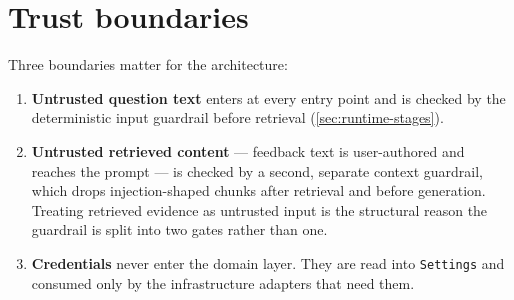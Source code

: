 \section{Trust boundaries}

Three boundaries matter for the architecture:

\begin{enumerate}
  \item \textbf{Untrusted question text} enters at every entry point and is
    checked by the deterministic input guardrail before retrieval
    (\cref{sec:runtime-stages}).
  \item \textbf{Untrusted retrieved content} --- feedback text is user-authored
    and reaches the prompt --- is checked by a second, separate context
    guardrail, which drops injection-shaped chunks after retrieval and before
    generation. Treating retrieved evidence as untrusted input is the
    structural reason the guardrail is split into two gates rather than one.
  \item \textbf{Credentials} never enter the domain layer. They are read into
    \texttt{Settings} and consumed only by the infrastructure adapters that
    need them.
\end{enumerate}

